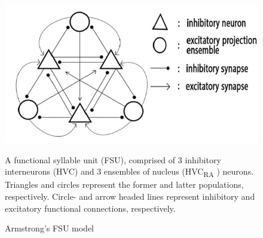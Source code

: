 \documentclass[draft,12pt,oneside]{CUNY_PhD}
\begin{document}
\begin{figure}[h]
\centering
\includegraphics[scale=0.3]{FSU}
\caption{Armstrong's FSU model \cite{21}}\label{Fig 4}
A functional syllable unit (FSU), comprised of 3 inhibitory interneurons (HVC) and 3 ensembles of nucleus (HVC\textsubscript{RA} ) neurons. Triangles and circles represent the former and latter populations, respectively. Circle- and arrow headed lines represent inhibitory and excitatory functional connections, respectively.
\end{figure}
\end{document}
